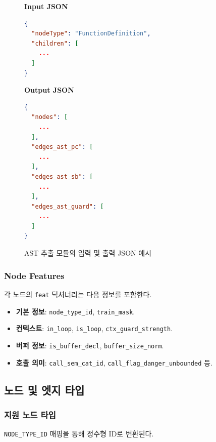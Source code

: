 \begin{figure}[H]
    \centering
    \begin{minipage}[t]{0.47\textwidth}
        \vspace{0pt}
        \textbf{Input JSON}
        \begin{lstlisting}[language=json]
{
  "nodeType": "FunctionDefinition",
  "children": [
    ...
  ]
}
        \end{lstlisting}
    \end{minipage}
    \hfill
    \begin{minipage}[t]{0.47\textwidth}
        \vspace{0pt}
        \textbf{Output JSON}
        \begin{lstlisting}[language=json]
{
  "nodes": [
    ...
  ],
  "edges_ast_pc": [
    ...
  ],
  "edges_ast_sb": [
    ...
  ],
  "edges_ast_guard": [
    ...
  ]
}
        \end{lstlisting}
    \end{minipage}
    \caption{AST 추출 모듈의 입력 및 출력 JSON 예시}
    \label{fig:ast_io_json}
\end{figure}

\subsubsection{Node Features}
각 노드의 \texttt{feat} 딕셔너리는 다음 정보를 포함한다.

\begin{itemize}
    \item \textbf{기본 정보}: \texttt{node\_type\_id}, \texttt{train\_mask}.
    \item \textbf{컨텍스트}: \texttt{in\_loop}, \texttt{is\_loop}, \texttt{ctx\_guard\_strength}.
    \item \textbf{버퍼 정보}: \texttt{is\_buffer\_decl}, \texttt{buffer\_size\_norm}.
    \item \textbf{호출 의미}: \texttt{call\_sem\_cat\_id}, \texttt{call\_flag\_danger\_unbounded} 등.
\end{itemize}

\subsection{노드 및 엣지 타입}

\subsubsection{지원 노드 타입}
\texttt{NODE\_TYPE\_ID} 매핑을 통해 정수형 ID로 변환된다.

